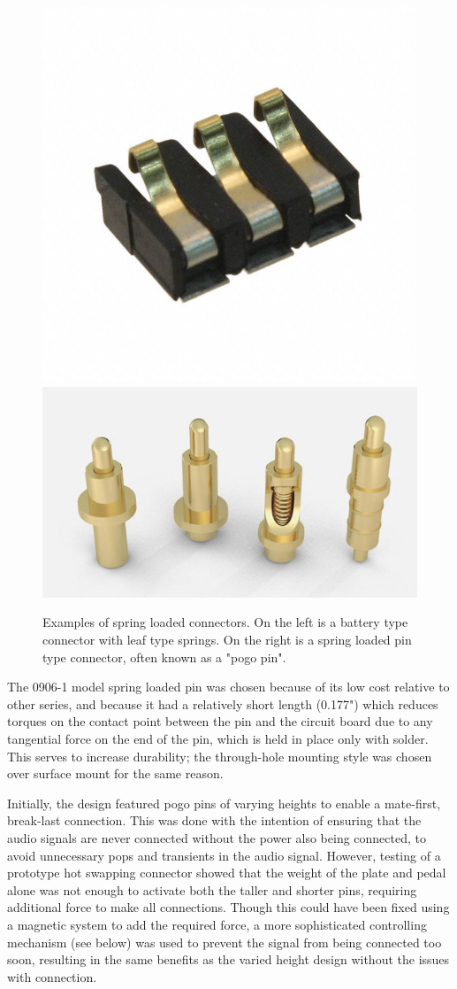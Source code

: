 		\begin{figure}
			\centering
			\includegraphics[width = 0.4\linewidth]{PR2Images/batteryconn}
			\includegraphics[width = 0.4\linewidth]{PR2Images/springpin.jpg}
			\caption{Examples of spring loaded connectors.  On the left is a battery type connector with leaf type springs.  On the right is a spring loaded pin type connector, often known as a "pogo pin".}
			\label{fig:springloaded}
		\end{figure}

		The 0906-1 model spring loaded pin was chosen because of its low cost relative to other series, and because it had a relatively short length (0.177") which reduces torques on the contact point between the pin and the circuit board due to any tangential force on the end of the pin, which is held in place only with solder.  This serves to increase durability; the through-hole mounting style was chosen over surface mount for the same reason.

		Initially, the design featured pogo pins of varying heights to enable a mate-first, break-last connection.  This was done with the intention of ensuring that the audio signals are never connected without the power also being connected, to avoid unnecessary pops and transients in the audio signal.  However, testing of a prototype hot swapping connector showed that the weight of the plate and pedal alone was not enough to activate both the taller and shorter pins, requiring additional force to make all connections.  Though this could have been fixed using a magnetic system to add the required force, a more sophisticated controlling mechanism (see below) was used to prevent the signal from being connected too soon, resulting in the same benefits as the varied height design without the issues with connection.

